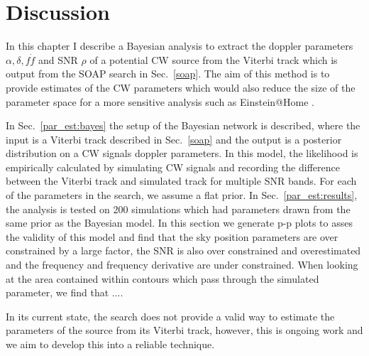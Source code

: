 %
%
\section{Discussion}
%
%

In this chapter I describe a Bayesian analysis to extract the doppler parameters $\alpha, \delta, f \dot{f}$ and \gls{SNR} $\rho$ of a potential \gls{CW} source from the Viterbi track which is output from the SOAP search in Sec.~\ref{soap}.
The aim of this method is to provide estimates of the \gls{CW} parameters which would also reduce the size of the parameter space for a more sensitive analysis such as Einstein@Home \citep{singh2016ResultsAllsky}. 

In Sec.~\ref{par_est:bayes} the setup of the Bayesian network is described, where the input is a Viterbi track described in Sec.~\ref{soap} and the output is a posterior distribution on a \gls{CW} signals doppler parameters.
In this model, the likelihood is empirically calculated by simulating \gls{CW} signals and recording the difference between the Viterbi track and simulated track for multiple \gls{SNR} bands. 
For each of the parameters in the search, we assume a flat prior.
In Sec.~\ref{par_est:results}, the analysis is tested on 200 simulations which had parameters drawn from the same prior as the Bayesian model.
In this section we generate p-p plots to asses the validity of this model and find that the sky position parameters are over constrained by a large factor, the \gls{SNR} is also over constrained and overestimated and the frequency and frequency derivative are under constrained.
When looking at the area contained within contours which pass through the simulated parameter, we find that ....

In its current state, the search does not provide a valid way to estimate the parameters of the source from its Viterbi track, however, this is ongoing work and we aim to develop this into a reliable technique.




